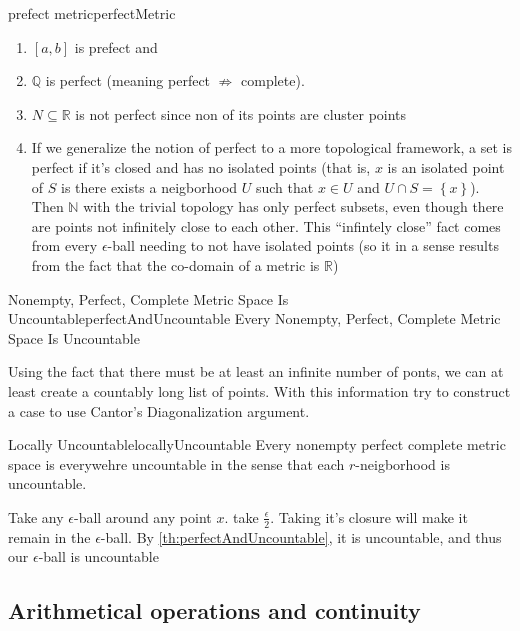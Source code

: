 \documentclass{book}
\newcommand{\N}{{\mathbb{N}}}
\newcommand{\Q}{{\mathbb{Q}}}
\newcommand{\R}{{\mathbb{R}}}
\newcommand{\sse}{\subseteq}
\newcommand{\Rw}{\Rightarrow}
\newenvironment{Proof}[1][]
  {\begin{ProofTcb}[#1]}
  {\end{ProofTcb}}
\begin{document}
\begin{example}{prefect metric}{perfectMetric}
	\begin{enumerate}
		\item $[a,b]$ is prefect and
		\item $\Q$ is perfect (meaning perfect $\not\Rw$ complete).
		\item $N \sse \R$ is not perfect since non of its points are cluster points
		\item If we generalize the notion of perfect to a more topological framework, a set is perfect if it's closed
			and has no isolated points (that is, $x$ is an isolated point of $S$ is there exists a neigborhood $U$ such
			that $x \in U$ and $U\cap S = \left\{ x \right\}$). Then $\N$ with the trivial topology has only perfect
			subsets, even though there are points not infinitely close to each other. This ``infintely close'' fact
			comes from every $\epsilon$-ball needing to not have isolated points (so it in a sense results from the fact
			that the co-domain of a metric is $\R$)
	\end{enumerate}
\end{example}

\begin{thm}{Nonempty, Perfect, Complete Metric Space Is Uncountable}{perfectAndUncountable}
 Every Nonempty, Perfect, Complete Metric Space Is Uncountable
\end{thm}

\begin{Proof}
	Using the fact that there must be at least an infinite number of ponts, we can at least create a countably long list
	of points. With this information try to construct a case to use Cantor's Diagonalization argument.
\end{Proof}


\begin{cor}{Locally Uncountable}{locallyUncountable}
	Every nonempty perfect complete metric space is everywehre uncountable in the sense that each $r$-neigborhood is
	uncountable.
\end{cor}

\begin{Proof}
	Take any $\epsilon$-ball around any point $x$. take $\frac{\epsilon}{2}$. Taking it's closure will make it remain in
	the $\epsilon$-ball. By \ref{th:perfectAndUncountable}, it is uncountable, and thus our $\epsilon$-ball is
	uncountable
\end{Proof}


\subsection{Arithmetical operations and continuity}
\end{document}
